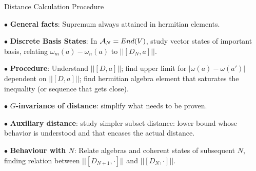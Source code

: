 \begin{frame}{Distance Calculation Procedure} %
    
     $\bullet$ \textbf{General facts}: Supremum always attained in hermitian elements.
     
     $\bullet$ \textbf{Discrete Basis States}: In $\mathcal A_N = End(V)$, study vector states of important basis, relating $\omega_m(a) - \omega_n(a)$ to $||[D_N, a]||$.
     
     $\bullet$ \textbf{Procedure}: Understand $||[D, a]||$; find upper limit for $|\omega(a) - \omega(a')|$ dependent on $||[D, a]||$; find hermitian algebra element that saturates the inequality (or sequence that gets close). 

    $\bullet$ \textbf{$G$-invariance of distance}: simplify what needs to be proven.
    
    $\bullet$ \textbf{Auxiliary distance}: study simpler subset distance: lower bound whose behavior is understood and that encases the actual distance.
    
    $\bullet$ \textbf{Behaviour with $N$}: Relate algebras and coherent states of subsequent $N$, finding relation between $||[D_{N+1}, \cdot]||$ and $||[D_N, \cdot]||$.
    
\end{frame}